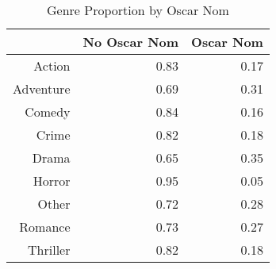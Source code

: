 \begin{table}[H]
\centering
\begin{tabular}{rrr}
  \hline
 & No Oscar Nom & Oscar Nom \\ 
  \hline
Action & 0.83 & 0.17 \\ 
  Adventure & 0.69 & 0.31 \\ 
  Comedy & 0.84 & 0.16 \\ 
  Crime & 0.82 & 0.18 \\ 
  Drama & 0.65 & 0.35 \\ 
  Horror & 0.95 & 0.05 \\ 
  Other & 0.72 & 0.28 \\ 
  Romance & 0.73 & 0.27 \\ 
  Thriller & 0.82 & 0.18 \\ 
   \hline
\end{tabular}
\caption{Genre Proportion by Oscar Nom} 
\label{tab:gnon}
\end{table}

